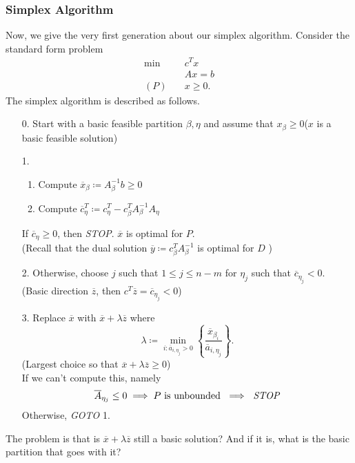 \subsubsection{Simplex Algorithm}
Now, we give the very first generation about our simplex algorithm. Consider the standard form problem
\[
	\begin{alignedat}{5}
		\min~&c^{T}x\\
		&Ax = b \\
		(P)\quad&x\geq  0.
	\end{alignedat}
\]
The simplex algorithm is described as follows.
\begin{enumerate}
	\item[0.] Start with a basic feasible partition \(\beta, \eta\) and assume that \(x_{\beta}\geq 0\)(\(x\) is a basic feasible solution)
	\item[1.] \begin{enumerate}
			\item Compute \(\overline{x}_{\beta} \coloneqq A^{-1}_{\beta} b \geq 0\)
			\item Compute \(\overline{c}_{\eta}^{T} \coloneqq c_{\eta}^{T} - c_{\beta}^{T} A^{-1}_{\beta} A_{\eta}\)
		\end{enumerate}
		If \(\overline{c}_{\eta} \geq 0\), then \emph{STOP}. \(\overline{x}\) is optimal for \(P\). \\(Recall that the dual solution \(\overline{y}\coloneqq c_{\beta}^{T}A^{-1}_{\beta}\) is optimal for \(D\) )
	\item[2.] Otherwise, choose \(j\) such that \(1\leq j\leq n-m\) for \(\eta_j\) such that \(\overline{c}_{\eta_j} < 0\). (Basic direction \(\overline{z}\), then \(c^{T}\overline{z} = \overline{c}_{\eta_{j}}<0\))
	\item[3.] Replace \(\overline{x}\) with \(\overline{x} + \lambda \overline{z}\) where
		\[
			\lambda \coloneqq \min_{i:\overline{a}_{i, \eta_{j}}>0}\left\{ \frac{\overline{x}_{\beta_{i}}}{\overline{a}_{i, \eta_{j}}} \right\}.
		\]
		(Largest choice so that \(\overline{x} + \lambda \overline{z} \geq 0\))\\
		If we can't compute this, namely
		\[
			\overline{A}_{\eta_{j}} \leq 0\implies P \text{ is unbounded }\implies \text{ \emph{STOP}}
		\]
		Otherwise, \emph{GOTO} 1.
\end{enumerate}

\begin{problem}
The problem is that is \(\overline{x}+\lambda \overline{z}\) still a basic solution? And if it is, what is the basic partition that goes with it?
\end{problem}

